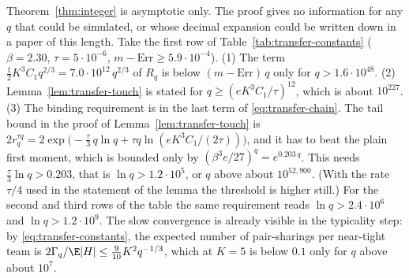 \begin{remark}\label{rem:transfer-size}
Theorem~\ref{thm:integer} is asymptotic only. The proof gives no information for any $q$ that
could be simulated, or whose decimal expansion could be written down in a paper of this
length. Take the first row of Table~\ref{tab:transfer-constants} ($\beta=2.30$,
$\tau=5\cdot10^{-6}$, $m-\mathrm{Err}\ge5.9\cdot10^{-4}$).
(1) The term $\tfrac12K^3C_1q^{2/3}=7.0\cdot10^{12}\,q^{2/3}$ of $R_q$ is below
$(m-\mathrm{Err})\,q$ only for $q>1.6\cdot10^{48}$.
(2) Lemma~\ref{lem:transfer-touch} is stated for $q\ge(eK^3C_1/\tau)^{12}$, which is about
$10^{227}$.
(3) The binding requirement is in the last term of \eqref{eq:transfer-chain}. The tail bound in
the proof of Lemma~\ref{lem:transfer-touch} is $2r_q^{\tau q}=
2\exp\bigl(-\tfrac{\tau}{3}\,q\ln q+\tau q\ln(eK^3C_1/(2\tau))\bigr)$, and it has to beat the
plain first moment, which is bounded only by $(\beta^3e/27)^q=e^{0.203\,q}$. This needs
$\tfrac{\tau}{3}\ln q>0.203$, that is $\ln q>1.2\cdot10^{5}$, or $q$ above about
$10^{52{,}900}$. (With the rate $\tau/4$ used in the statement of the lemma the threshold is
higher still.) For the second and third rows of the table the same requirement reads
$\ln q>2.4\cdot10^{6}$ and $\ln q>1.2\cdot10^{9}$.
The slow convergence is already visible in the typicality step: by
\eqref{eq:transfer-constants}, the expected number of pair-sharings per near-tight team is
$2\Gamma_q/\E|H|\le\tfrac{9}{10}K^2q^{-1/3}$, which at $K=5$ is below $0.1$ only for $q$ above
about $10^{7}$.
\end{remark}
